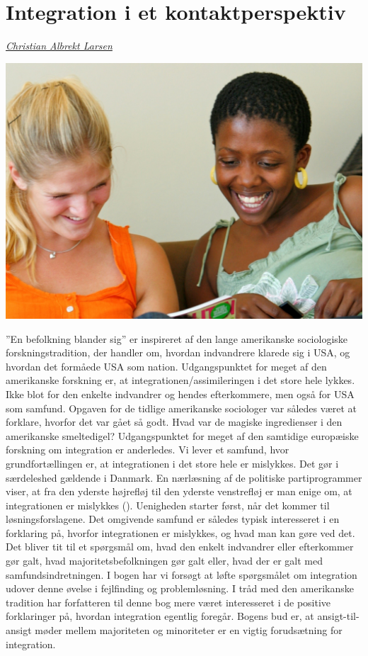 \documentclass[
]{book}
\begin{document}
\chapter{Integration i et kontaktperspektiv}\label{kap7}

\emph{\href{https://vbn.aau.dk/en/persons/albrekt}{Christian Albrekt Larsen}}

\includegraphics[width=1\linewidth]{images/kap71}

''En befolkning blander sig'' er inspireret af den lange amerikanske sociologiske forskningstradition, der handler om, hvordan indvandrere klarede sig i USA, og hvordan det formåede USA som nation. Udgangspunktet for meget af den amerikanske forskning er, at integrationen/assimileringen i det store hele lykkes. Ikke blot for den enkelte indvandrer og hendes efterkommere, men også for USA som samfund. Opgaven for de tidlige amerikanske sociologer var således været at forklare, hvorfor det var gået så godt. Hvad var de magiske ingredienser i den amerikanske smeltedigel? Udgangspunktet for meget af den samtidige europæiske forskning om integration er anderledes. Vi lever et samfund, hvor grundfortællingen er, at integrationen i det store hele er mislykkes. Det gør i særdeleshed gældende i Danmark. En nærlæsning af de politiske partiprogrammer viser, at fra den yderste højrefløj til den yderste venstrefløj er man enige om, at integrationen er mislykkes (). Uenigheden starter først, når det kommer til løsningsforslagene. Det omgivende samfund er således typisk interesseret i en forklaring på, hvorfor integrationen er mislykkes, og hvad man kan gøre ved det. Det bliver tit til et spørgsmål om, hvad den enkelt indvandrer eller efterkommer gør galt, hvad majoritetsbefolkningen gør galt eller, hvad der er galt med samfundsindretningen. I bogen har vi forsøgt at løfte spørgsmålet om integration udover denne øvelse i fejlfinding og problemløsning. I tråd med den amerikanske tradition har forfatteren til denne bog mere været interesseret i de positive forklaringer på, hvordan integration egentlig foregår. Bogens bud er, at ansigt-til-ansigt møder mellem majoriteten og minoriteter er en vigtig forudsætning for integration.
\end{document}
